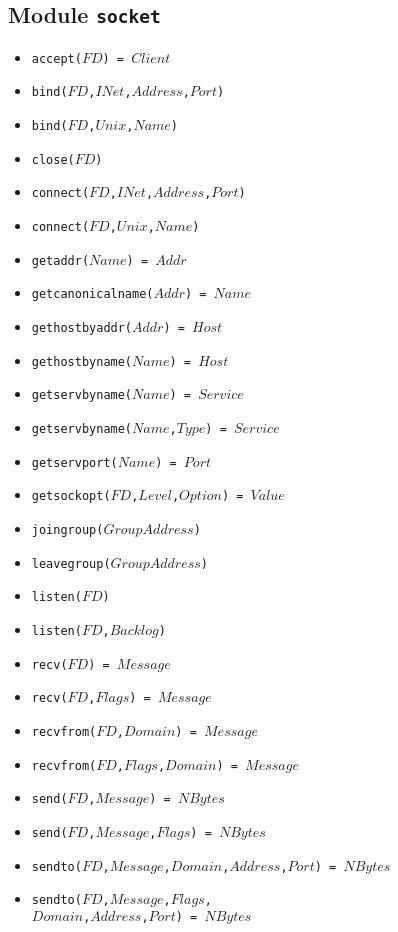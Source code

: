 \documentclass[10pt]{article}
\begin{document}
\begin{multicols}{2}
{\section*{Module \texttt{socket}}
\begin{scriptsize}
\begin{itemize}
    \item \texttt{accept($FD$) = $Client$}
    \item \texttt{bind($FD$,$INet$,$Address$,$Port$)}
    \item \texttt{bind($FD$,$Unix$,$Name$)}
    \item \texttt{close($FD$)}
    \item \texttt{connect($FD$,$INet$,$Address$,$Port$)}
    \item \texttt{connect($FD$,$Unix$,$Name$)}
    \item \texttt{getaddr($Name$) = $Addr$}
    \item \texttt{getcanonicalname($Addr$) = $Name$}
    \item \texttt{gethostbyaddr($Addr$) = $Host$}
    \item \texttt{gethostbyname($Name$) = $Host$}
    \item \texttt{getservbyname($Name$) = $Service$}
    \item \texttt{getservbyname($Name$,$Type$) = $Service$}
    \item \texttt{getservport($Name$) = $Port$}
    \item \texttt{getsockopt($FD$,$Level$,$Option$) = $Value$}
    \item \texttt{joingroup($GroupAddress$)}
    \item \texttt{leavegroup($GroupAddress$)}
    \item \texttt{listen($FD$)}
    \item \texttt{listen($FD$,$Backlog$)}
    \item \texttt{recv($FD$) = $Message$}
    \item \texttt{recv($FD$,$Flags$) = $Message$}
    \item \texttt{recvfrom($FD$,$Domain$) = $Message$}
    \item \texttt{recvfrom($FD$,$Flags$,$Domain$) = $Message$}
    \item \texttt{send($FD$,$Message$) = $NBytes$}
    \item \texttt{send($FD$,$Message$,$Flags$) = $NBytes$}
    \item \texttt{sendto($FD$,$Message$,$Domain$,$Address$,$Port$) = $NBytes$}
    \item \texttt{sendto($FD$,$Message$,$Flags$, \\        $Domain$,$Address$,$Port$) = $NBytes$}

\end{itemize}
\end{scriptsize}}
\end{multicols}
\end{document}

